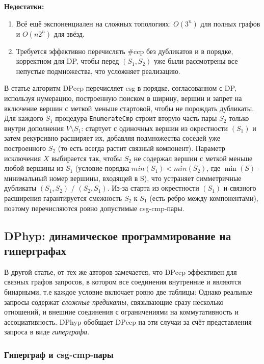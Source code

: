 \textbf{Недостатки:}
\begin{enumerate}
    \item Всё ещё экспоненциален на сложных топологиях: $O(3^{n})$ для полных графов и $O(n2^{n})$ для звёзд.
    \item Требуется эффективно перечислять \#ccp без дубликатов и в порядке, корректном для DP,
    чтобы перед $(S_1, S_2)$ уже были рассмотрены все непустые подмножества, что усложняет реализацию.
\end{enumerate}
В статье алгоритм DPccp перечисляет csg  в порядке, согласованном с DP, используя нумерацию, построенную поиском в ширину, вершин и запрет на включение вершин с меткой меньше стартовой, чтобы не порождать дубликаты.
Для каждого $S_1$ процедура \texttt{EnumerateCmp} строит вторую часть пары $S_2$ только внутри дополнения $V\setminus S_1$: стартует с одиночных вершин из окрестности $(S_1)$ и затем рекурсивно расширяет их, добавляя подмножества соседей уже построенного $S_2$ (то есть всегда растит связный компонент).
Параметр исключения $X$ выбирается так, чтобы $S_2$ не содержал вершин с меткой меньше любой вершины из $S_1$ (условие порядка $min(S_1) < min(S_2)$, где $\min(S)$ - минимальный номер вершины, 
входящей в S), что устраняет симметричные дубликаты $(S_1,S_2)$ / $(S_2,S_1)$.
Из-за старта из окрестности $(S_1)$ и связного расширения гарантируется смежность $S_2$ к $S_1$ (есть ребро между компонентами), поэтому перечисляются ровно допустимые csg-cmp-пары.



\subsection{DPhyp: динамическое программирование на гиперграфах}


В другой статье, от тех же авторов \cite{MoeNeu} замечается, что
DPccp эффективен для связных графов запросов, в котором все соединения внутренние и являются бинарными, т.е каждое условие включает ровно две таблицы: 
Однако реальные запросы содержат \emph{сложные предикаты}, связывающие сразу несколько отношений, 
и внешние соединения с ограничениями на коммутативность и ассоциативность. DPhyp обобщает DPccp на эти случаи 
за счёт представления запроса в виде \emph{гиперграфа}.


\subsubsection{Гиперграф и csg-cmp-пары}

